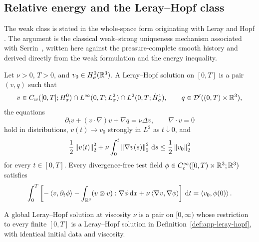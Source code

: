 \subsection{Relative energy and the Leray–Hopf class}

The weak class is stated in the whole-space form originating with Leray and
Hopf \cite{Leray1934,Hopf1951}.  The argument is the classical weak--strong
uniqueness mechanism associated with Serrin~\cite{Serrin1962}, written here
against the pressure-complete smooth history and derived directly from the
weak formulation and the energy inequality.

\begin{definition}
\label{def:app-leray-hopf}
Let \(\nu>0\), \(T>0\), and \(v_0\in H^0_\sigma(\mathbb R^3)\).  A Leray--Hopf solution on
\([0,T]\) is a pair \((v,q)\) such that
\[
 v\in C_w([0,T];H^0_\sigma)
 \cap L^\infty(0,T;L^2_\sigma)
 \cap L^2(0,T;\dot H^1_\sigma),
 \qquad
 q\in\mathcal D'((0,T)\times\mathbb R^3),
\]
the equations
\[
 \partial_tv+(v\cdot\nabla)v+\nabla q=\nu\Delta v,
 \qquad
 \nabla\cdot v=0
\]
hold in distributions, \(v(t)\to v_0\) strongly in \(L^2\) as
\(t\downarrow0\), and
\begin{equation}
 \frac12\left\lVert v(t)\right\rVert_2^2
 +\nu\int_0^t\left\lVert \nabla v(s)\right\rVert_2^2\,\mathrm d s
 \le\frac12\left\lVert v_0\right\rVert_2^2
 \label{eq:app-leray-energy}
\end{equation}
for every \(t\in[0,T]\).  Every divergence-free test field
\(\phi\in C_c^\infty([0,T)\times\mathbb R^3;\mathbb R^3)\) satisfies
\begin{equation}
 \int_0^T\left[
 -\left\langle v,\partial_t\phi\right\rangle
 -\int_{\mathbb R^3}(v\otimes v):\nabla\phi\,\mathrm d x
 +\nu\left\langle \nabla v,\nabla\phi\right\rangle
 \right]\,\mathrm d t
 =\left\langle v_0,\phi(0)\right\rangle.
 \label{eq:app-leray-weak-form}
\end{equation}
\end{definition}

A global Leray--Hopf solution at viscosity \(\nu\) is a pair on
\([0,\infty)\) whose restriction to every finite \([0,T]\) is a
Leray--Hopf solution in Definition~\ref{def:app-leray-hopf}, with identical initial data and viscosity.

